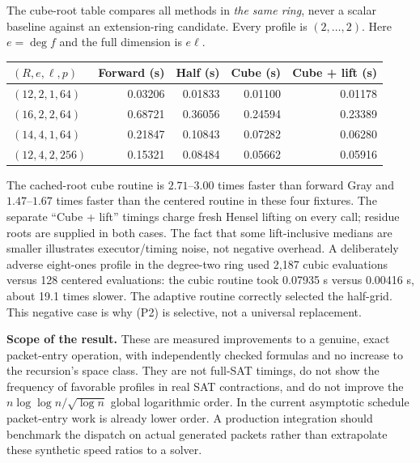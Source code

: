 The cube-root table compares all methods in \emph{the same ring}, never a scalar
baseline against an extension-ring candidate. Every profile is $(2,\ldots,2)$.
Here $e=\deg f$ and the full dimension is $e\ell$.
\begin{center}\small
\begin{tabular}{@{}lrrrr@{}}\toprule
$(R,e,\ell,p)$ & Forward (s) & Half (s) & Cube (s) & Cube + lift (s)\\\midrule
$(12,2,1,64)$ &0.03206&0.01833&0.01100&0.01178\\
$(16,2,2,64)$ &0.68721&0.36056&0.24594&0.23389\\
$(14,4,1,64)$ &0.21847&0.10843&0.07282&0.06280\\
$(12,4,2,256)$&0.15321&0.08484&0.05662&0.05916\\\bottomrule
\end{tabular}
\end{center}
The cached-root cube routine is $2.71$--$3.00$ times faster than forward Gray and
$1.47$--$1.67$ times faster than the centered routine in these four fixtures.
The separate ``Cube + lift'' timings charge fresh Hensel lifting on every call;
residue roots are supplied in both cases. The fact that some lift-inclusive
medians are smaller illustrates executor/timing noise, not negative overhead.
A deliberately adverse eight-ones profile in the degree-two ring used 2,187
cubic evaluations versus 128 centered evaluations: the cubic routine took
0.07935 s versus 0.00416 s, about 19.1 times slower. The adaptive routine
correctly selected the half-grid. This negative case is why (P2) is selective,
not a universal replacement.

\textbf{Scope of the result.} These are measured improvements to a genuine,
exact packet-entry operation, with independently checked formulas and no
increase to the recursion's space class. They are not full-SAT timings, do not
show the frequency of favorable profiles in real SAT contractions, and do not
improve the $n\log\log n/\sqrt{\log n}$ global logarithmic order. In the current
asymptotic schedule packet-entry work is already lower order. A production
integration should benchmark the dispatch on actual generated packets rather
than extrapolate these synthetic speed ratios to a solver.
